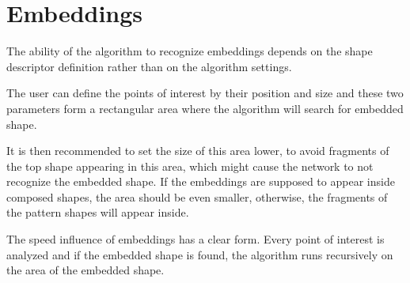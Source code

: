 \section{Embeddings}
The ability of the algorithm to recognize embeddings depends on the shape descriptor definition rather than on the algorithm settings. 

The user can define the points of interest by their position and size and these two parameters form a rectangular area where the algorithm will search for embedded shape. 

It is then recommended to set the size of this area lower, to avoid fragments of the top shape appearing in this area, which might cause the network to not recognize the embedded shape. If the embeddings are supposed to appear inside composed shapes, the area should be even smaller, otherwise, the fragments of the pattern shapes will appear inside. 

The speed influence of embeddings has a clear form. Every point of interest is analyzed and if the embedded shape is found, the algorithm runs recursively on the area of the embedded shape.

